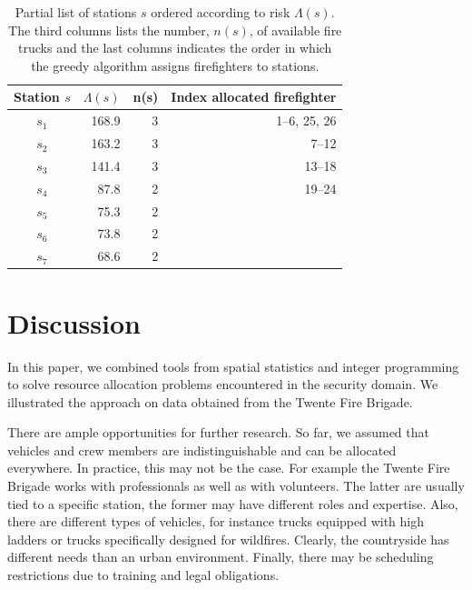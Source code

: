 \documentclass[twoside,11pt]{article}
\begin{document}
   \begin{table}[hbt]
        \centering
        \begin{tabular}{|c|r|r|r|} \hline
        Station $s$ & $\Lambda(s)$ & n(s) &
           Index allocated firefighter  \\
        \hline
        $s_1$ &  168.9 &  3 & 1--6, 25, 26 \\
        $s_2$ &  163.2 &  3 & 7--12\\
        $s_3$ & 141.4 &  3 &  13--18 \\
        $s_4$ &  87.8 & 2 & 19--24 \\
        $s_5$ & 75.3 & 2 &      \\
        $s_6$ & 73.8 & 2 &  \\
        $s_7$ & 68.6 & 2 &  \\ \hline
       \end{tabular}
        \caption{Partial list of stations $s$ ordered according
        to risk $\Lambda(s)$. The third columns lists the 
        number, $n(s)$, of available fire trucks and the last columns 
        indicates the order in which the greedy algorithm assigns 
        firefighters to stations.}
        \label{tab:TwenteCrew}
    \end{table}

\section{Discussion}

In this paper, we combined tools from spatial statistics and
integer programming to solve resource allocation problems 
encountered in the security domain. We illustrated the approach
on data obtained from the Twente Fire Brigade. 

There are ample opportunities for further research.
So far, we assumed that vehicles and crew members are 
indistinguishable and can be allocated everywhere. 
In practice, this may not be the case. For example the Twente
Fire Brigade works with professionals as well as with volunteers.
The latter are usually tied to a specific station, the former
may have different roles and expertise.  Also, there are 
different types of vehicles, for instance trucks equipped 
with high ladders or trucks specifically designed for wildfires. 
Clearly, the countryside has different needs than an urban 
environment. Finally, there may be scheduling restrictions due 
to training and legal obligations.
\end{document}
